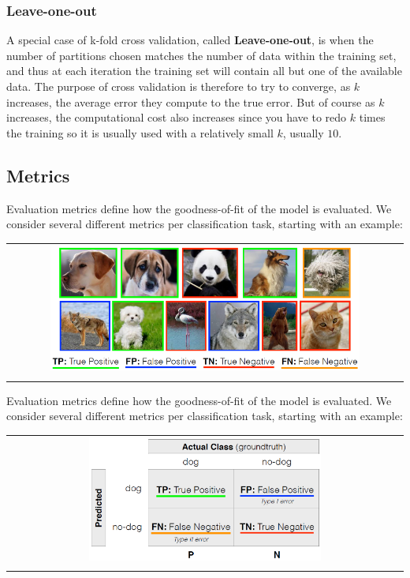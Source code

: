\subsubsection{Leave-one-out}
A special case of k-fold cross validation, called \textbf{Leave-one-out}, is when the number of partitions chosen matches the number of data within the training set, and thus at each iteration the training set will contain all but one of the available data.
The purpose of cross validation is therefore to try to converge, as $k$ increases, the average error they compute to the true error. But of course as $k$ increases, the computational cost also increases since you have to redo $k$ times the training so it is usually used with a relatively small $k$, usually $10$.

\subsection{Metrics}
Evaluation metrics define how the goodness-of-fit of the model is evaluated.  We consider several different metrics per classification task, starting with an example:
\begin{center}
    \begin{tabular}{c}
        \\ \includegraphics[width=0.8\textwidth]{images/Metrics1.png} \\ \\
    \end{tabular}
\end{center}
Evaluation metrics define how the goodness-of-fit of the model is evaluated.  We consider several different metrics per classification task, starting with an example:
\begin{center}
    \begin{tabular}{c}
        \\ \includegraphics[width=0.6\textwidth]{images/Metrics2.png} \\ \\
    \end{tabular}
\end{center}
